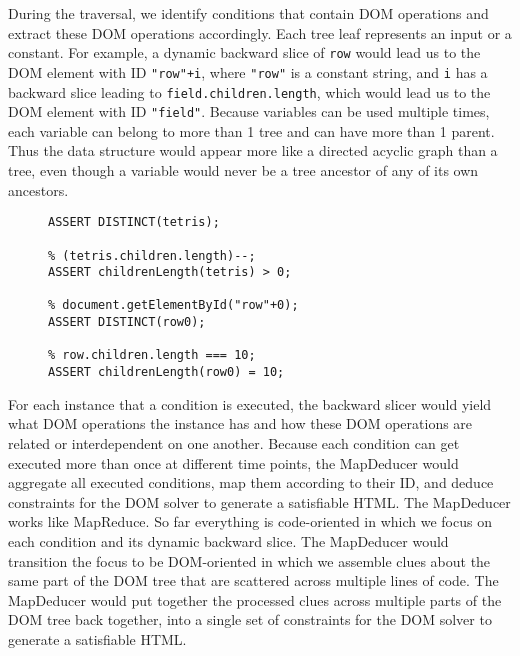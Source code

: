 During the traversal, we identify conditions that contain DOM operations and extract these DOM operations accordingly.  Each tree leaf represents an input or a constant.  
For example, a dynamic backward slice of {\tt row} would lead us to the DOM element with ID {\tt "row"+i}, where {\tt "row"} is a constant string, and {\tt i} has a backward slice leading to {\tt field.children.length}, which would lead us to the DOM element with ID {\tt "field"}.  
Because variables can be used multiple times, each variable can belong to more than 1 tree and can have more than 1 parent.  Thus the data structure would appear more like a directed acyclic graph than a tree, even though a variable would never be a tree ancestor of any of its own ancestors.  

\begin{figure}
\begin{lstlisting}[caption=DOM constraints for generating an HTML that would satisfy for going the {\tt True} branch in the {\tt if} statement of Sample Code ~\ref{dom0}.  The constraints are shown in the input format for the CVC~\cite{cvc3} implementation of the SMT solver. "\%" is the comment operator in CVC.,label=constraints0]
% document.getElementById("tetris");
ASSERT DISTINCT(tetris);

% (tetris.children.length)--;
ASSERT childrenLength(tetris) > 0;

% document.getElementById("row"+0);
ASSERT DISTINCT(row0);

% row.children.length === 10;
ASSERT childrenLength(row0) = 10;
\end{lstlisting}
\end{figure}

For each instance that a condition is executed, the backward slicer would yield what DOM operations the instance has and how these DOM operations are related or interdependent on one another.  
Because each condition can get executed more than once at different time points, the MapDeducer would aggregate all executed conditions, map them according to their ID, and deduce constraints for the DOM solver to generate a satisfiable HTML.  
The MapDeducer works like MapReduce.  So far everything is code-oriented in which we focus on each condition and its dynamic backward slice.  The MapDeducer would transition the focus to be DOM-oriented in which we assemble clues about the same part of the DOM tree that are scattered across multiple lines of code.  
The MapDeducer would put together the processed clues across multiple parts of the DOM tree back together, into a single set of constraints for the DOM solver to generate a satisfiable HTML.

